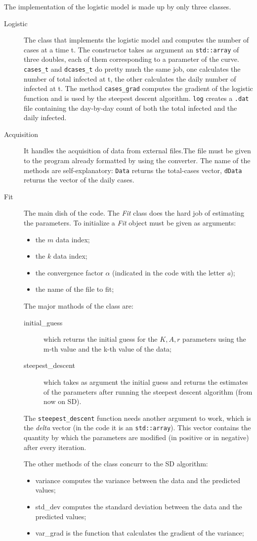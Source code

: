The implementation of the logistic model is made up by only three classes.
\begin{description}
\item[Logistic] The class that implements the logistic model and computes the number of cases at a time t. The constructor takes as argument an \verb!std::array! of three doubles, each of them corresponding to a parameter of the curve. \verb!cases_t! and \verb!dcases_t! do pretty much the same job, one calculates the number of total infected at t, the other calculates the daily number of infected at t. The method \verb!cases_grad! computes the gradient of the logistic function and is used by the steepest descent algorithm. \verb!log! creates a \verb!.dat! file containing the day-by-day count of both the total infected and the daily infected.
\item[Acquisition] It handles the acquisition of data from external files.The file must be given to the program already formatted by using the converter. The name of the methods are self-explanatory: \verb!Data! returns the total-cases vector, \verb!dData! returns the vector of the daily cases.
\item[Fit] The main dish of the code. The \emph{Fit} class does the hard job of estimating the parameters. To initialize a \emph{Fit} object must be given as arguments:
\begin{itemize}
\item the $m$ data index;
\item the $k$ data index;
\item the convergence factor $\alpha$ (indicated in the code with the letter \emph{a});
\item the name of the file to fit;
\end{itemize}
The major mathods of the class are:
\begin{description}
\item[initial\_guess] which returns the initial guess for the $K, A, r$ parameters using the m-th value and the k-th value of the data;
\item[steepest\_descent] which takes as argument the initial guess and returns the estimates of the parameters after running the steepest descent algorithm (from now on SD).
\end{description}
The \verb!steepest_descent! function needs another argument to work, which is the \emph{delta} vector (in the code it is an \verb!std::array!). This vector contains the quantity by which the parameters are modified (in positive or in negative) after every iteration.

The other methods of the class concurr to the SD algorithm: 
\begin{itemize}
\item variance computes the variance between the data and the predicted values;
\item std\_dev computes the standard deviation between the data and the predicted values;
\item var\_grad is the function that calculates the gradient of the variance;
\end{itemize}
\end{description}

